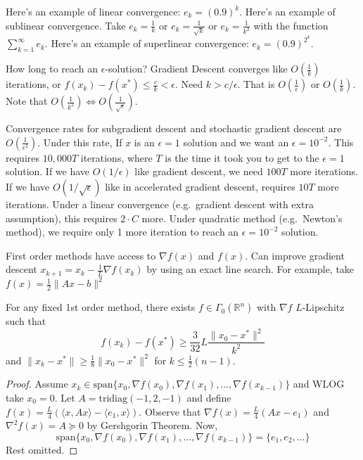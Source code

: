 \documentclass[english, 11pt]{article}
\begin{document}
\begin{exmp}
Here's an example of linear convergence: $e_k = (0.9)^k$. Here's an example of sublinear convergence. Take $e_k = \frac{1}{k}$ or $e_k = \frac{1}{\sqrt{k}}$ or $e_k = \frac{1}{k^2}$ with the function $\sum_{k=1}^\infty e_k$. Here's an example of superlinear convergence: $e_k = (0.9)^{2^k}$.
\end{exmp}

\begin{rem}
How long to reach an $\epsilon$-solution? Gradient Descent converges like $O(\frac{1}{k})$ iterations, or $f(x_k) - f(x^*) \le \frac{c}{k} < \epsilon$. Need $k>c/\epsilon$. That is $O(\frac{1}{\epsilon})$ or $O(\frac{1}{k})$. Note that $O(\frac{1}{k^2}) \iff O(\frac{1}{\sqrt{\epsilon}})$.

Convergence rates for subgradient descent and stochastic gradient descent are $O( \frac{1}{\epsilon^2} )$.
Under this rate, If $x$ is an $\epsilon=1$ solution and we want an $\epsilon=10^{-2}$. This requires $10,000T$ iterations, where $T$ is the time it took you to get to the $\epsilon=1$ solution.
If we have $O(1/\epsilon)$ like gradient descent, we need $100T$ more iterations. If we have $O(1/\sqrt{\epsilon})$ like in accelerated gradient descent, requires $10T$ more iterations.  Under a linear convergence (e.g.\ gradient descent with extra assumption), this requires $2 \cdot C$ more. Under quadratic method (e.g.\ Newton's method), we require only 1 more iteration to reach an $\epsilon=10^{-2}$ solution.
\end{rem}


\begin{rem}
First order methods have access to $\nabla f(x)$ and $f(x)$. Can improve gradient descent $x_{k+1} = x_k - \frac{1}{L} \nabla f(x_k)$ by using an exact line search. For example, take $f(x) = \frac{1}{2} \|Ax-b\|^2$

\end{rem}


\begin{thrm}
For any fixed 1st order method, there exists $f \in \Gamma_0(\mathbb{R}^n)$ with $\nabla f$ $L$-Lipschitz such that
\[
f(x_k) - f(x^*) \ge \frac{3}{32} L \frac{ \|x_0 - x^* \|^2}{k^2}
\]
and $\|x_k - x^*\| \ge \frac{1}{8} \|x_0 - x^*\|^2$ for $k \le \frac{1}{2} (n-1)$.
\end{thrm}

\begin{proof}
Assume $x_k \in \text{span} \{ x_0 , \nabla f(x_0), \nabla f(x_1),\dots,\nabla f(x_{k-1}) \}$ and WLOG take $x_0 =0$. Let $A = \text{tridiag}(-1,2,-1)$ and define $f(x) = \frac{L}{4} \left( \langle x, Ax \rangle- \langle e_1, x \rangle \right)$. Observe that $\nabla f(x) = \frac{L}{4} (Ax-e_1)$ and $\nabla^2 f(x) = A \succeq 0$ by Gershgorin Theorem. Now,
\[
\text{span} \{ x_0 , \nabla f(x_0), \nabla f(x_1),\dots,\nabla f(x_{k-1}) \}
= \{e_1,e_2,\dots\}
\]
Rest omitted.
\end{proof}
\end{document}
